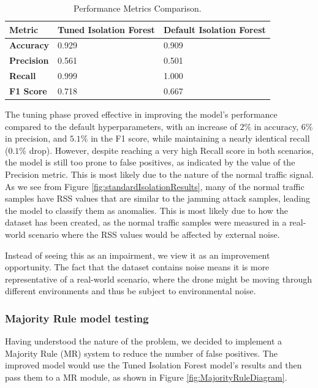 \documentclass[futureinternet,article,submit,pdftex,moreauthors]{Definitions/mdpi}
\begin{document}
\begin{table}[H]
    \caption{Performance Metrics Comparison.}\label{tab:performanceMetrics}
    \begin{tabularx}{\textwidth}{CCC}
    \toprule
    \textbf{Metric} & \textbf{Tuned Isolation Forest} & \textbf{Default Isolation Forest} \\
    \midrule
    \textbf{Accuracy} & 0.929 & 0.909 \\
    \textbf{Precision} & 0.561 & 0.501 \\
    \textbf{Recall} & 0.999 & 1.000 \\
    \textbf{F1 Score} & 0.718 & 0.667 \\
    \bottomrule
    \end{tabularx}
\end{table}


The tuning phase proved effective in improving the model's performance compared to the default hyperparameters, with an increase of $2\%$ in accuracy, $6\%$ in precision, and $5.1\%$ in the F1 score, while maintaining a nearly identical recall ($0.1\%$ drop). However, despite reaching a very high Recall score in both scenarios, the model is still too prone to false positives, as indicated by the value of the Precision metric. 
This is most likely due to the nature of the normal traffic signal. As we see from Figure \ref{fig:standardIsolationResults}, many of the normal traffic samples have RSS values that are similar to the jamming attack samples, leading the model to classify them as anomalies.
This is most likely due to how the dataset has been created, as the normal traffic samples were measured in a real-world scenario where the RSS values would be affected by external noise. 

Instead of seeing this as an impairment, we view it as an improvement opportunity. The fact that the dataset contains noise means it is more representative of a real-world scenario, where the drone might be moving through different environments and thus be subject to environmental noise.

\subsubsection{Majority Rule model testing} \label{sec:majorityRuleModelTesting}

Having understood the nature of the problem, we decided to implement a Majority Rule (MR) system to reduce the number of false positives. The improved model would use the Tuned Isolation Forest model's results and then pass them to a MR module, as shown in Figure \ref{fig:MajorityRuleDiagram}. 
\end{document}
